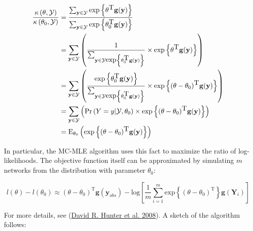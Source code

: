 \documentclass[
]{book}
\begin{document}
\begin{align*}
\frac{\kappa\left(\theta,\mathcal{Y}\right)}{\kappa\left(\theta_0,\mathcal{Y}\right)} & = 
  \frac{
    \sum_{\mathbf{y}\in\mathcal{Y}}\mbox{exp}\left\{\theta^{\mbox{T}}\mathbf{g}(\mathbf{y})\right\}}{ 
    \sum_{\mathbf{y}\in\mathcal{Y}}\mbox{exp}\left\{\theta_0^{\mbox{T}}\mathbf{g}(\mathbf{y})\right\} 
  } \\
& = \sum_{\mathbf{y}\in\mathcal{Y}}\left( %
  \frac{1}{%
    \sum_{\mathbf{y}\in\mathcal{Y}\mbox{exp}\left\{\theta_0^{\mbox{T}}\mathbf{g}(\mathbf{y})\right\}}%
  } \times %
  \mbox{exp}\left\{\theta^{\mbox{T}}\mathbf{g}(\mathbf{y})\right\} %
  \right) \\
& = \sum_{\mathbf{y}\in\mathcal{Y}}\left( %
  \frac{\mbox{exp}\left\{\theta_0^{\mbox{T}}\mathbf{g}(\mathbf{y})\right\}}{%
    \sum_{\mathbf{y}\in\mathcal{Y}\mbox{exp}\left\{\theta_0^{\mbox{T}}\mathbf{g}(\mathbf{y})\right\}}%
  } \times %
  \mbox{exp}\left\{(\theta - \theta_0)^{\mbox{T}}\mathbf{g}(\mathbf{y})\right\} %
  \right) \\
& = \sum_{\mathbf{y}\in\mathcal{Y}}\left( %
  \mbox{Pr}\left(Y = y|\mathcal{Y}, \theta_0\right) \times %
  \mbox{exp}\left\{(\theta - \theta_0)^{\mbox{T}}\mathbf{g}(\mathbf{y})\right\} %
  \right) \\
& = \mbox{E}_{\theta_0}\left(\mbox{exp}\left\{(\theta - \theta_0)^{\mbox{T}}\mathbf{g}(\mathbf{y})\right\} \right)
\end{align*}

In particular, the MC-MLE algorithm uses this fact to maximize the ratio of log-likelihoods. The objective function itself can be approximated by simulating \(m\) networks from the distribution with parameter \(\theta_0\):

\[
l(\theta) - l(\theta_0) \approx (\theta - \theta_0)^{\mbox{T}}\mathbf{g}(\mathbf{y}_{obs}) - 
\mbox{log}{\left[\frac{1}{m}\sum_{i = 1}^m\mbox{exp}\left\{(\theta-\theta_0)^{\mbox{T}}\right\}\mathbf{g}(\mathbf{Y}_i)\right]}
\]

For more details, see (\protect\hyperlink{ref-Hunter2008}{David R. Hunter et al. 2008}). A sketch of the algorithm follows:
\end{document}
